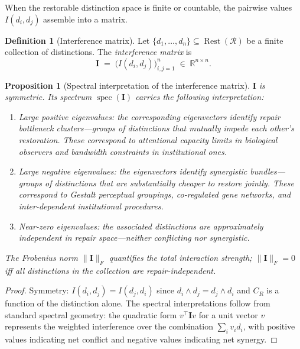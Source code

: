\documentclass[12pt, oneside]{article}
\theoremstyle{plain}
\newtheorem{proposition}[theorem]{Proposition}
\theoremstyle{definition}
\newtheorem{definition}[theorem]{Definition}
\theoremstyle{remark}
\theoremstyle{definition}
\DeclareMathOperator{\Rest}{Rest}
\DeclareMathOperator{\spec}{spec}
\newcommand{\CR}{C_{\!R}}
\newcommand{\IntMat}{\mathbf{I}}
\begin{document}
When the restorable distinction space is finite or countable,
the pairwise values $I(d_i, d_j)$ assemble into a matrix.

\begin{definition}[Interference matrix]
  Let $\{d_1, \ldots, d_n\} \subseteq \Rest(\mathcal{R})$ be a finite
  collection of distinctions.
  The \emph{interference matrix} is
  \[
    \IntMat \;=\; \bigl(I(d_i, d_j)\bigr)_{i,j=1}^n \;\in\; \mathbb{R}^{n \times n}.
  \]
  \label{def:int-matrix}
\end{definition}

\begin{proposition}[Spectral interpretation of the interference matrix]
  $\IntMat$ is symmetric.
  Its spectrum $\spec(\IntMat)$ carries the following interpretation:
  \begin{enumerate}
    \item \emph{Large positive eigenvalues}: the corresponding
      eigenvectors identify \emph{repair bottleneck clusters}---groups
      of distinctions that mutually impede each other's restoration.
      These correspond to attentional capacity limits in biological
      observers and bandwidth constraints in institutional ones.
    \item \emph{Large negative eigenvalues}: the eigenvectors identify
      \emph{synergistic bundles}---groups of distinctions that are
      substantially cheaper to restore jointly.
      These correspond to Gestalt perceptual groupings, co-regulated
      gene networks, and inter-dependent institutional procedures.
    \item \emph{Near-zero eigenvalues}: the associated distinctions are
      approximately independent in repair space---neither conflicting
      nor synergistic.
  \end{enumerate}
  The Frobenius norm $\|\IntMat\|_F$ quantifies the total interaction
  strength; $\|\IntMat\|_F = 0$ iff all distinctions in the collection
  are repair-independent.
  \label{prop:spectrum}
\end{proposition}

\begin{proof}
  Symmetry: $I(d_i, d_j) = I(d_j, d_i)$ since $d_i \wedge d_j =
  d_j \wedge d_i$ and $\CR$ is a function of the distinction alone.
  The spectral interpretations follow from standard spectral geometry:
  the quadratic form $v^\top \IntMat v$ for a unit vector $v$
  represents the weighted interference over the combination
  $\sum_i v_i d_i$, with positive values indicating net conflict and
  negative values indicating net synergy.
\end{proof}
\end{document}
